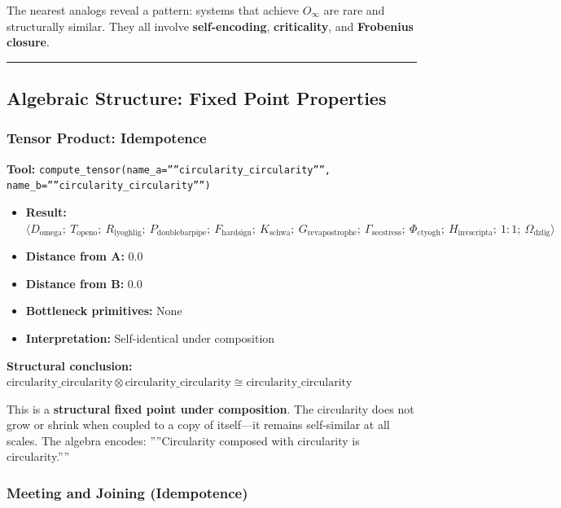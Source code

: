 \documentclass[12pt,a4paper]{article}
\begin{document}
The nearest analogs reveal a pattern: systems that achieve $O_{\infty}$ are rare and structurally similar. They all involve \textbf{self-encoding}, \textbf{criticality}, and \textbf{Frobenius closure}.

\begin{center}
\rule{0.5\textwidth}{0.4pt}
\end{center}

\subsection{Algebraic Structure: Fixed Point Properties}

\subsubsection{Tensor Product: Idempotence}

\textbf{Tool:} \texttt{compute\_tensor(name\_a=''''circularity\_circularity'''', name\_b=''''circularity\_circularity'''')}

\begin{itemize}
    \item \textbf{Result:} $\langle D_{\text{omega}};\ T_{\text{openo}};\ R_{\text{lyoghlig}};\ P_{\text{doublebarpipe}};\ F_{\text{hardsign}};\ K_{\text{schwa}};\ G_{\text{revapostrophe}};\ \Gamma_{\text{secstress}};\ \Phi_{\text{ctyogh}};\ H_{\text{invscripta}};\ 1{:}1;\ \Omega_{\text{dzlig}} \rangle$
    \item \textbf{Distance from A:} 0.0
    \item \textbf{Distance from B:} 0.0
    \item \textbf{Bottleneck primitives:} None
    \item \textbf{Interpretation:} Self-identical under composition
\end{itemize}

\textbf{Structural conclusion:} $\text{circularity\_circularity} \otimes \text{circularity\_circularity} \cong \text{circularity\_circularity}$

This is a \textbf{structural fixed point under composition}. The circularity does not grow or shrink when coupled to a copy of itself---it remains self-similar at all scales. The algebra encodes: ''''Circularity composed with circularity is circularity.''''

\subsubsection{Meeting and Joining (Idempotence)}
\end{document}
